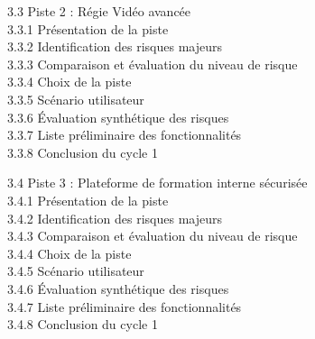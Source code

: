 \documentclass[12pt,a4paper]{report}
\begin{document}
\vspace{0.2cm}
\hspace*{0.8cm}\textcolor{orangeil}{3.3 Piste 2 : Régie Vidéo avancée} \\
\hspace*{1.6cm}3.3.1 Présentation de la piste \\
\hspace*{1.6cm}3.3.2 Identification des risques majeurs \\
\hspace*{1.6cm}3.3.3 Comparaison et évaluation du niveau de risque \\
\hspace*{1.6cm}3.3.4 Choix de la piste \\
\hspace*{1.6cm}3.3.5 Scénario utilisateur \\
\hspace*{1.6cm}3.3.6 Évaluation synthétique des risques \\
\hspace*{1.6cm}3.3.7 Liste préliminaire des fonctionnalités \\
\hspace*{1.6cm}3.3.8 Conclusion du cycle 1 

\vspace{0.2cm}
\hspace*{0.8cm}\textcolor{orangeil}{3.4 Piste 3 : Plateforme de formation interne sécurisée} \\
\hspace*{1.6cm}3.4.1 Présentation de la piste \\
\hspace*{1.6cm}3.4.2 Identification des risques majeurs \\
\hspace*{1.6cm}3.4.3 Comparaison et évaluation du niveau de risque \\
\hspace*{1.6cm}3.4.4 Choix de la piste \\
\hspace*{1.6cm}3.4.5 Scénario utilisateur \\
\hspace*{1.6cm}3.4.6 Évaluation synthétique des risques \\
\hspace*{1.6cm}3.4.7 Liste préliminaire des fonctionnalités \\
\hspace*{1.6cm}3.4.8 Conclusion du cycle 1 
\end{document}
